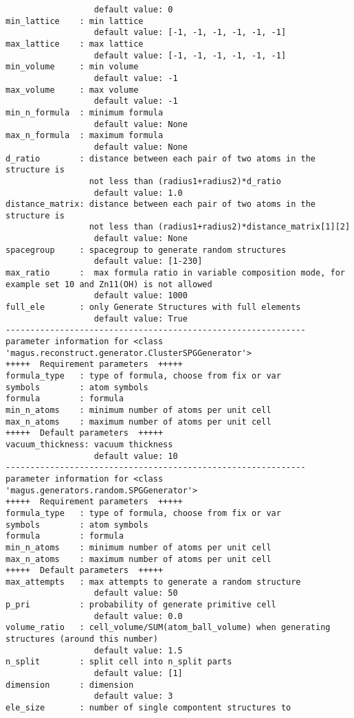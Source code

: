 \documentclass[12pt,oneside]{book}
\begin{document}
\begin{tcolorbox}
\begin{verbatim}
                  default value: 0
min_lattice    : min lattice
                  default value: [-1, -1, -1, -1, -1, -1]
max_lattice    : max lattice
                  default value: [-1, -1, -1, -1, -1, -1]
min_volume     : min volume
                  default value: -1
max_volume     : max volume
                  default value: -1
min_n_formula  : minimum formula
                  default value: None
max_n_formula  : maximum formula
                  default value: None
d_ratio        : distance between each pair of two atoms in the structure is
                 not less than (radius1+radius2)*d_ratio
                  default value: 1.0
distance_matrix: distance between each pair of two atoms in the structure is
                 not less than (radius1+radius2)*distance_matrix[1][2]
                  default value: None
spacegroup     : spacegroup to generate random structures
                  default value: [1-230]
max_ratio      :  max formula ratio in variable composition mode, for example set 10 and Zn11(OH) is not allowed
                  default value: 1000
full_ele       : only Generate Structures with full elements
                  default value: True
-------------------------------------------------------------
parameter information for <class 'magus.reconstruct.generator.ClusterSPGGenerator'>
+++++  Requirement parameters  +++++
formula_type   : type of formula, choose from fix or var
symbols        : atom symbols
formula        : formula
min_n_atoms    : minimum number of atoms per unit cell
max_n_atoms    : maximum number of atoms per unit cell
+++++  Default parameters  +++++
vacuum_thickness: vacuum thickness
                  default value: 10
-------------------------------------------------------------
parameter information for <class 'magus.generators.random.SPGGenerator'>
+++++  Requirement parameters  +++++
formula_type   : type of formula, choose from fix or var
symbols        : atom symbols
formula        : formula
min_n_atoms    : minimum number of atoms per unit cell
max_n_atoms    : maximum number of atoms per unit cell
+++++  Default parameters  +++++
max_attempts   : max attempts to generate a random structure
                  default value: 50
p_pri          : probability of generate primitive cell
                  default value: 0.0
volume_ratio   : cell_volume/SUM(atom_ball_volume) when generating structures (around this number)
                  default value: 1.5
n_split        : split cell into n_split parts
                  default value: [1]
dimension      : dimension
                  default value: 3
ele_size       : number of single compontent structures to

\end{verbatim}
\end{tcolorbox}
\end{document}
